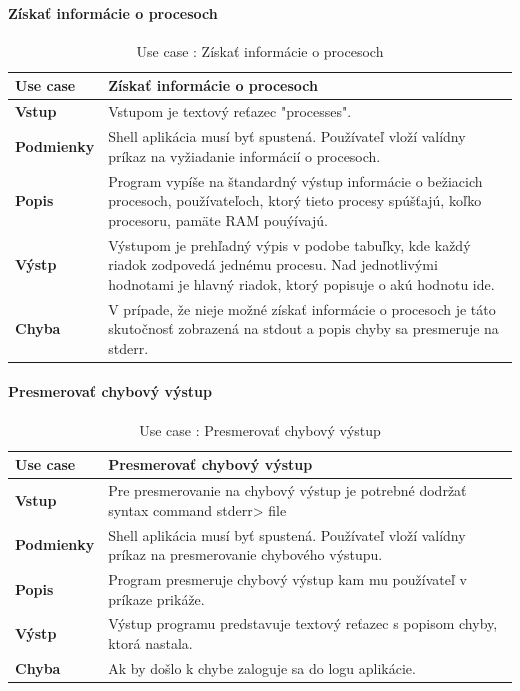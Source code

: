 \paragraph{Získať informácie o procesoch}
\begin{center}
	\begin{table}[htbp]
		\begin{tabular}{|p{2.5cm}|p{14cm}|}
			\hline
			\textbf{Use case} & Získať informácie o procesoch \\ 
			\hline
			\textbf{Vstup} & Vstupom je textový reťazec "processes".\\
			\hline
			\textbf{Podmienky} & Shell aplikácia musí byť spustená. Používateľ vloží valídny príkaz na vyžiadanie informácií o procesoch. \\ 
			\hline
			\textbf{Popis} & Program vypíše na štandardný výstup informácie o bežiacich procesoch, používateľoch, ktorý tieto procesy spúšťajú, koľko procesoru, pamäte RAM pouýívajú.\\ 
			\hline
			\textbf{Výstp} & Výstupom je prehľadný výpis v podobe tabuľky, kde každý riadok zodpovedá jednému procesu. Nad jednotlivými hodnotami je hlavný riadok, ktorý popisuje o akú hodnotu ide.\\
			\hline
			\textbf{Chyba} & V prípade, že nieje možné získať informácie o procesoch je táto skutočnosť zobrazená na stdout a popis chyby sa presmeruje na stderr.\\
			\hline
		\end{tabular}
		\label{table:1}
		\caption{Use case : Získať informácie o procesoch}
	\end{table}
\end{center}
\newpage
\paragraph{Presmerovať chybový výstup}
\begin{center}
	\begin{table}[htbp]
		\begin{tabular}{|p{2.5cm}|p{14cm}|}
			\hline
			\textbf{Use case} & Presmerovať chybový výstup \\ 
			\hline
			\textbf{Vstup} & Pre presmerovanie na chybový výstup je potrebné dodržať syntax command stderr> file\\
			\hline
			\textbf{Podmienky} & Shell aplikácia musí byť spustená. Používateľ vloží valídny príkaz na presmerovanie chybového výstupu. \\ 
			\hline
			\textbf{Popis} & Program presmeruje chybový výstup kam mu používateľ v príkaze prikáže. \\ 
			\hline
			\textbf{Výstp} & Výstup programu predstavuje textový reťazec s popisom chyby, ktorá nastala.\\
			\hline
			\textbf{Chyba} & Ak by došlo k chybe zaloguje sa do logu aplikácie.\\
			\hline
		\end{tabular}
		\label{table:1}
		\caption{Use case : Presmerovať chybový výstup}
	\end{table}
\end{center}
